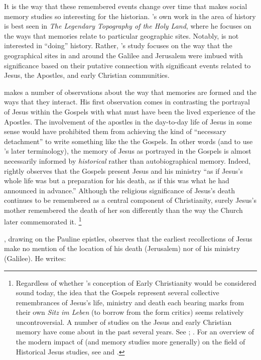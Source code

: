 It is the way that these remembered events change over time that makes social memory studies so interesting for the historian. \halbwachs's own work in the area of history is best seen in \emph{The Legendary Topography of the Holy Land}, where he focuses on the ways that memories relate to particular geographic sites. Notably, \halbwachs is not interested in ``doing'' history. Rather, \halbwachs's study focuses on the way that the geographical sites in and around the Galilee and Jerusalem were imbued with significance based on their putative connection with significant events related to Jesus, the Apostles, and early Christian communities. 

\halbwachs makes a number of observations about the way that memories are formed and the ways that they interact. His first observation comes in contrasting the portrayal of Jesus within the Gospels with what must have been the lived experience of the Apostles.\autocite[193--198]{halbwachs1992} The involvement of the apostles in the day-to-day life of Jesus in some sense would have prohibited them from achieving the kind of ``necessary detachment'' to write something like the the Gospels. In other words (and to use \halbwachs's later terminology), the memory of Jesus as portrayed in the Gospels is almost necessarily informed by \emph{historical} rather than autobiographical memory.\autocite[194]{halbwachs1992} Indeed, \halbwachs rightly observes that the Gospels present Jesus and his ministry ``as if Jesus's whole life was but a preparation for his death, as if this was what he had announced in advance.''\autocite[198]{halbwachs1992} Although the religious significance of Jesus's death continues to be remembered as a central component of Christianity, surely Jesus's mother remembered the death of her son differently than the way the Church later commemorated it.%
%
\footnote{Regardless of whether \halbwachs's conception of Early Christianity would be considered sound today, the idea that the Gospels represent several collective remembrances of Jesus's life, ministry and death each bearing marks from their own \emph{Sitz im Leben} (to borrow from the form critics) seems relatively uncontroversial. A number of studies on the Jesus and early Christian memory have come about in the past several years. See \cite{ledonne2009}; \cite{rodriguez2010}. For an overview of the modern impact of \halbwachs (and memory studies more generally) on the field of Historical Jesus studies, see \cite{keith_ec2015} and \cite{keith_ec2015b}.}

\halbwachs, drawing on the Pauline epistles, observes that the earliest recollections of Jesus make no mention of the location of his death (Jerusalem) nor of his ministry (Galilee). He writes:  

